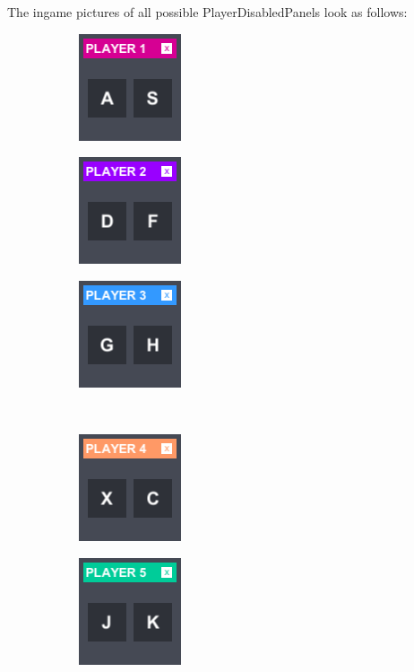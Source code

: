 \noindent The ingame pictures of all possible PlayerDisabledPanels look as follows:

\begin{figure}[h!] 
	\centering
	\begin{subfigure}{0.195\textwidth}
		\centering
		\includegraphics[scale=1, frame]{gui-imgs/player1enabledpanel}
	\end{subfigure}
	\begin{subfigure}{0.195\textwidth}
		\centering
		\includegraphics[scale=1, frame]{gui-imgs/player2enabledpanel}
	\end{subfigure}
	\begin{subfigure}{0.195\textwidth}
		\centering
		\includegraphics[scale=1, frame]{gui-imgs/player3enabledpanel}
	\end{subfigure} \\
	\begin{subfigure}{0.195\textwidth}
		\centering
		\includegraphics[scale=1, frame]{gui-imgs/player4enabledpanel}
	\end{subfigure}
	\begin{subfigure}{0.195\textwidth}
		\centering
		\includegraphics[scale=1, frame]{gui-imgs/player5enabledpanel}

\end{subfigure}
\end{figure}
